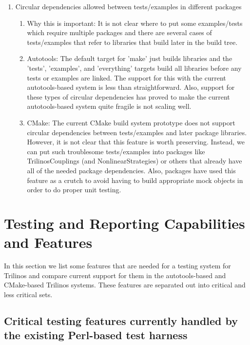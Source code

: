 \documentclass[pdf,ps2pdf,11pt]{SANDreport}
\begin{document}
\begin{enumerate}
\begin{enumerate}
  \end{enumerate}

{}\item Circular dependencies allowed between tests/examples in
different packages

  \begin{enumerate}

  {}\item Why this is important: It is not clear where to put some
  examples/tests which require multiple packages and there are
  several cases of tests/examples that refer to libraries that build
  later in the build tree.

  {}\item Autotools: The default target for 'make' just builds
  libraries and the 'tests', 'examples', and 'everything' targets
  build all libraries before any tests or examples are linked.  The
  support for this with the current autotools-based system is less than
  straightforward.  Also, support for these types of circular
  dependencies has proved to make the current autotools-based system
  quite fragile is not scaling well.

  {}\item CMake: The current CMake build system prototype does not
  support circular dependencies between tests/examples and later package
  libraries.  However, it is not clear that this feature is worth
  preserving.  Instead, we can put such troublesome tests/examples
  into packages like TrilinosCouplings (and NonlinearStrategies) or
  others that already have all of the needed package dependencies.
  Also, packages have used this feature as a crutch to avoid having to
  build appropriate mock objects in order to do proper unit testing.

  \end{enumerate}

\end{enumerate}


%
\section{Testing and Reporting Capabilities and Features}
%

In this section we list some features that are needed for a testing
system for Trilinos and compare current support for them in the
autotools-based and CMake-based Trilinos systems.  These features are
separated out into critical and less critical sets.


%
{}\subsection{Critical testing features currently handled by the
existing Perl-based test harness}
%
\end{document}
